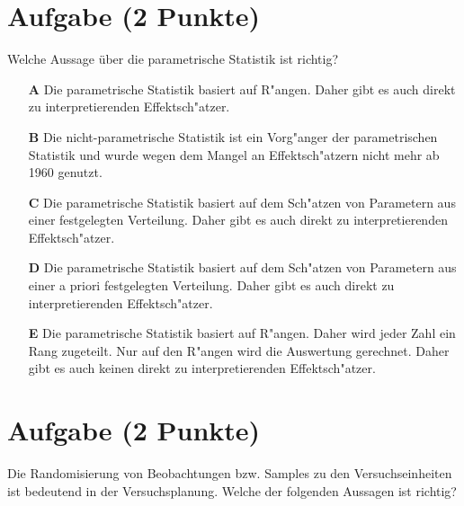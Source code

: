\documentclass[a4paper, 10pt]{scrartcl}\usepackage[]{graphicx}\usepackage[]{xcolor}
\begin{document}
\section{Aufgabe \hfill (2 Punkte)}




Welche Aussage {\"u}ber die parametrische Statistik ist richtig?



\begin{enumerate}
\item [\textbf{A} \msquare] Die parametrische Statistik basiert auf R{"a}ngen. Daher gibt es auch direkt zu interpretierenden Effektsch{"a}tzer.
\item [\textbf{B} \msquare] Die nicht-parametrische Statistik ist ein Vorg{"a}nger der parametrischen Statistik und wurde wegen dem Mangel an Effektsch{"a}tzern nicht mehr ab 1960 genutzt.
\item [\textbf{C} \msquare] Die parametrische Statistik basiert auf dem Sch{"a}tzen von Parametern aus einer festgelegten Verteilung. Daher gibt es auch direkt zu interpretierenden Effektsch{"a}tzer.
\item [\textbf{D} \msquare] Die parametrische Statistik basiert auf dem Sch{"a}tzen von Parametern aus einer a priori festgelegten Verteilung. Daher gibt es auch direkt zu interpretierenden Effektsch{"a}tzer.
\item [\textbf{E} \msquare] Die parametrische Statistik basiert auf R{"a}ngen. Daher wird jeder Zahl ein Rang zugeteilt. Nur auf den R{"a}ngen wird die Auswertung gerechnet. Daher gibt es auch keinen direkt zu interpretierenden Effektsch{"a}tzer.
\end{enumerate}

\section{Aufgabe \hfill (2 Punkte)}

Die Randomisierung von Beobachtungen bzw. Samples zu den Versuchseinheiten
ist bedeutend in der Versuchsplanung. Welche der folgenden Aussagen ist richtig?
\end{document}
